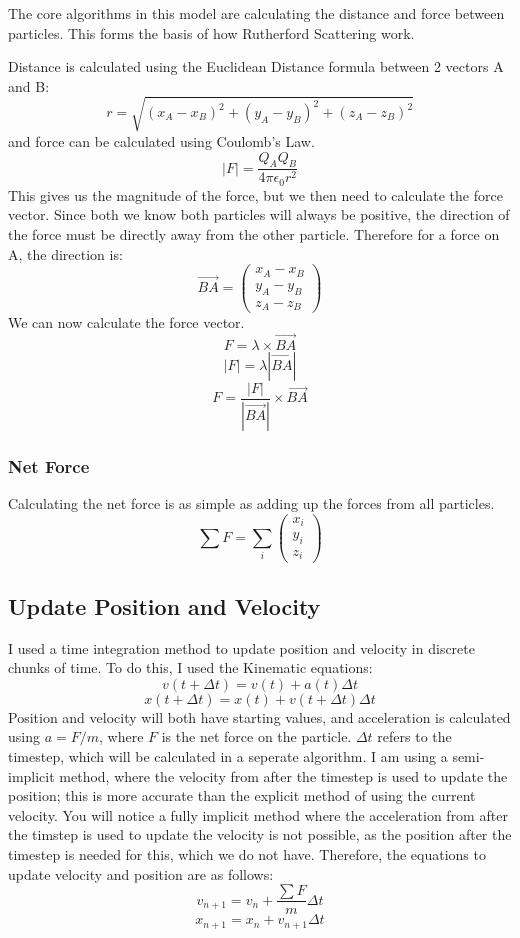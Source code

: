 \documentclass[11pt]{article}
\begin{document}
The core algorithms in this model are calculating the distance and force
between particles. This forms the basis of how Rutherford Scattering
work.

Distance is calculated using the Euclidean Distance formula between 2
vectors A and B:
\[ r = \sqrt{(x_{A}-x_{B})^{2}+(y_{A}-y_{B})^{2}+(z_{A}-z_{B})^{2}} \]
and force can be calculated using Coulomb's Law.
\[ {|F| = \frac {Q_{A}Q_{B}}{4\pi \epsilon_{0}r^{2}}} \] This gives us
the magnitude of the force, but we then need to calculate the force
vector. Since both we know both particles will always be positive, the
direction of the force must be directly away from the other particle.
Therefore for a force on A, the direction is:
\[ \vec{BA} = \begin{pmatrix} x_{A}-x_{B} \\ y_{A}-y_{B}  \\  z_{A}-z_{B} \end{pmatrix} \]
We can now calculate the force vector. \[ F =  \lambda\times\vec{BA} \]
\[ |F| =  \lambda|\vec{BA}| \]
\[ F = \frac{|F|}{|\vec{BA}|}\times \vec{BA} \]

\hypertarget{net-force}{%
\subsubsection{Net Force}\label{net-force}}

Calculating the net force is as simple as adding up the forces from all
particles.
\[ \sum F = \sum_{i}\begin{pmatrix} x_{i} \\ y_{i}  \\  z_{i} \end{pmatrix} \]

    \hypertarget{update-position-and-velocity}{%
\subsection{Update Position and
Velocity}\label{update-position-and-velocity}}

I used a time integration method to update position and velocity in
discrete chunks of time. To do this, I used the Kinematic equations:
\[ v(t+\Delta t) = v(t) + a(t)\Delta t \]
\[ x(t+\Delta t) = x(t) + v(t+\Delta t)\Delta t \] Position and velocity
will both have starting values, and acceleration is calculated using
\(a=F/m\), where \(F\) is the net force on the particle. \(\Delta t\)
refers to the timestep, which will be calculated in a seperate
algorithm. I am using a semi-implicit method, where the velocity from
after the timestep is used to update the position; this is more accurate
than the explicit method of using the current velocity. You will notice
a fully implicit method where the acceleration from after the timstep is
used to update the velocity is not possible, as the position after the
timestep is needed for this, which we do not have. Therefore, the
equations to update velocity and position are as follows:
\[ v_{n+1} = v_{n} + \frac{\sum F}{m}\Delta t \]
\[ x_{n+1} = x_{n} + v_{n+1}\Delta t \]
\end{document}
